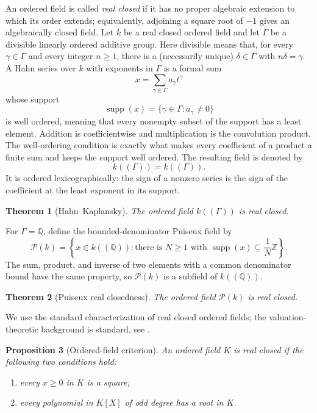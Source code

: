 \documentclass[11pt]{article}
\newcommand{\Hahn}{k((\Gamma))}
\newcommand{\Puiseux}{\mathcal P(k)}
\newcommand{\Supp}{\operatorname{supp}}
\theoremstyle{proofnote}
\newtheorem{theorem}{Theorem}[section]
\newtheorem{proposition}[theorem]{Proposition}
\begin{document}
An ordered field is called \emph{real closed} if it has no proper algebraic
extension to which its order extends; equivalently, adjoining a square root
of \(-1\) gives an algebraically closed field.  Let \(k\) be a real closed
ordered field and let \(\Gamma\) be a divisible linearly ordered additive
group.  Here divisible means that, for every
\(\gamma\in\Gamma\) and every integer \(n\ge1\), there is a (necessarily
unique) \(\delta\in\Gamma\) with \(n\delta=\gamma\).  A Hahn series over
\(k\) with exponents in \(\Gamma\) is a formal sum
\[
  x=\sum_{\gamma\in\Gamma} a_\gamma t^\gamma
\]
whose support
\[
  \Supp(x)=\{\gamma\in\Gamma:a_\gamma\ne0\}
\]
is well ordered, meaning that every nonempty subset of the support has a
least element.  Addition is coefficientwise and multiplication is the
convolution product.  The well-ordering condition is exactly what makes
every coefficient of a product a finite sum and keeps the support
well ordered.  The resulting field is denoted by
\[
  \Hahn=k((\Gamma)).
\]
It is ordered lexicographically: the sign of a nonzero series is the sign of
the coefficient at the least exponent in its support.

\begin{theorem}[Hahn--Kaplansky]
\label{thm:hahn-real-closed}
  The ordered field \(k((\Gamma))\) is real closed.
\end{theorem}

For \(\Gamma=\mathbb Q\), define the bounded-denominator Puiseux field by
\[
  \Puiseux
  =
  \left\{
    x\in k((\mathbb Q)):
    \text{there is }N\ge1\text{ with }
    \Supp(x)\subseteq \frac1N\mathbb Z
  \right\}.
\]
The sum, product, and inverse of two elements with a common denominator
bound have the same property, so \(\Puiseux\) is a subfield of
\(k((\mathbb Q))\).

\begin{theorem}[Puiseux real closedness]
\label{thm:puiseux-real-closed}
  The ordered field \(\Puiseux\) is real closed.
\end{theorem}

We use the standard characterization of real closed ordered fields; the
valuation-theoretic background is standard, see \cite{Kaplansky,EnglerPrestel}.
\begin{proposition}[Ordered-field criterion]
\label{prop:real-closed-criterion}
  An ordered field \(K\) is real closed if the following two conditions hold:
  \begin{enumerate}[label=(\roman*)]
    \item every \(x\ge0\) in \(K\) is a square;
    \item every polynomial in \(K[X]\) of odd degree has a root in \(K\).
  \end{enumerate}
\end{proposition}
\end{document}
